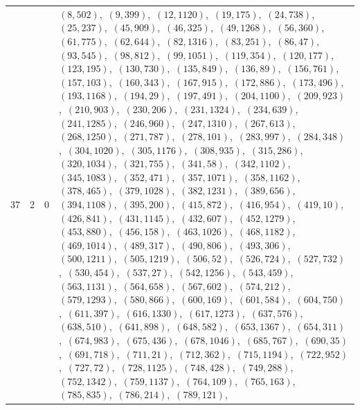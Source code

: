 \documentclass[11pt]{article}
\begin{document}
\begin{longtable}{@{}rrl>{\raggedright\arraybackslash}p{}@{}}
37 & 2 & $0$ & $(8,502)$,\allowbreak\ $(9,399)$,\allowbreak\ $(12,1120)$,\allowbreak\ $(19,175)$,\allowbreak\ $(24,738)$,\allowbreak\ $(25,237)$,\allowbreak\ $(45,909)$,\allowbreak\ $(46,325)$,\allowbreak\ $(49,1268)$,\allowbreak\ $(56,360)$,\allowbreak\ $(61,775)$,\allowbreak\ $(62,644)$,\allowbreak\ $(82,1316)$,\allowbreak\ $(83,251)$,\allowbreak\ $(86,47)$,\allowbreak\ $(93,545)$,\allowbreak\ $(98,812)$,\allowbreak\ $(99,1051)$,\allowbreak\ $(119,354)$,\allowbreak\ $(120,177)$,\allowbreak\ $(123,195)$,\allowbreak\ $(130,730)$,\allowbreak\ $(135,849)$,\allowbreak\ $(136,89)$,\allowbreak\ $(156,761)$,\allowbreak\ $(157,103)$,\allowbreak\ $(160,343)$,\allowbreak\ $(167,915)$,\allowbreak\ $(172,886)$,\allowbreak\ $(173,496)$,\allowbreak\ $(193,1168)$,\allowbreak\ $(194,29)$,\allowbreak\ $(197,491)$,\allowbreak\ $(204,1100)$,\allowbreak\ $(209,923)$,\allowbreak\ $(210,903)$,\allowbreak\ $(230,206)$,\allowbreak\ $(231,1324)$,\allowbreak\ $(234,639)$,\allowbreak\ $(241,1285)$,\allowbreak\ $(246,960)$,\allowbreak\ $(247,1310)$,\allowbreak\ $(267,613)$,\allowbreak\ $(268,1250)$,\allowbreak\ $(271,787)$,\allowbreak\ $(278,101)$,\allowbreak\ $(283,997)$,\allowbreak\ $(284,348)$,\allowbreak\ $(304,1020)$,\allowbreak\ $(305,1176)$,\allowbreak\ $(308,935)$,\allowbreak\ $(315,286)$,\allowbreak\ $(320,1034)$,\allowbreak\ $(321,755)$,\allowbreak\ $(341,58)$,\allowbreak\ $(342,1102)$,\allowbreak\ $(345,1083)$,\allowbreak\ $(352,471)$,\allowbreak\ $(357,1071)$,\allowbreak\ $(358,1162)$,\allowbreak\ $(378,465)$,\allowbreak\ $(379,1028)$,\allowbreak\ $(382,1231)$,\allowbreak\ $(389,656)$,\allowbreak\ $(394,1108)$,\allowbreak\ $(395,200)$,\allowbreak\ $(415,872)$,\allowbreak\ $(416,954)$,\allowbreak\ $(419,10)$,\allowbreak\ $(426,841)$,\allowbreak\ $(431,1145)$,\allowbreak\ $(432,607)$,\allowbreak\ $(452,1279)$,\allowbreak\ $(453,880)$,\allowbreak\ $(456,158)$,\allowbreak\ $(463,1026)$,\allowbreak\ $(468,1182)$,\allowbreak\ $(469,1014)$,\allowbreak\ $(489,317)$,\allowbreak\ $(490,806)$,\allowbreak\ $(493,306)$,\allowbreak\ $(500,1211)$,\allowbreak\ $(505,1219)$,\allowbreak\ $(506,52)$,\allowbreak\ $(526,724)$,\allowbreak\ $(527,732)$,\allowbreak\ $(530,454)$,\allowbreak\ $(537,27)$,\allowbreak\ $(542,1256)$,\allowbreak\ $(543,459)$,\allowbreak\ $(563,1131)$,\allowbreak\ $(564,658)$,\allowbreak\ $(567,602)$,\allowbreak\ $(574,212)$,\allowbreak\ $(579,1293)$,\allowbreak\ $(580,866)$,\allowbreak\ $(600,169)$,\allowbreak\ $(601,584)$,\allowbreak\ $(604,750)$,\allowbreak\ $(611,397)$,\allowbreak\ $(616,1330)$,\allowbreak\ $(617,1273)$,\allowbreak\ $(637,576)$,\allowbreak\ $(638,510)$,\allowbreak\ $(641,898)$,\allowbreak\ $(648,582)$,\allowbreak\ $(653,1367)$,\allowbreak\ $(654,311)$,\allowbreak\ $(674,983)$,\allowbreak\ $(675,436)$,\allowbreak\ $(678,1046)$,\allowbreak\ $(685,767)$,\allowbreak\ $(690,35)$,\allowbreak\ $(691,718)$,\allowbreak\ $(711,21)$,\allowbreak\ $(712,362)$,\allowbreak\ $(715,1194)$,\allowbreak\ $(722,952)$,\allowbreak\ $(727,72)$,\allowbreak\ $(728,1125)$,\allowbreak\ $(748,428)$,\allowbreak\ $(749,288)$,\allowbreak\ $(752,1342)$,\allowbreak\ $(759,1137)$,\allowbreak\ $(764,109)$,\allowbreak\ $(765,163)$,\allowbreak\ $(785,835)$,\allowbreak\ $(786,214)$,\allowbreak\ $(789,121)$,\allowbreak\ 
\end{longtable}
\end{document}
